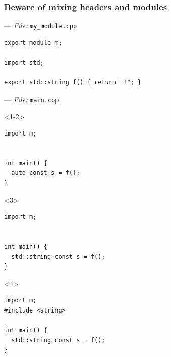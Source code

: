 \documentclass[aspectratio=169]{beamer}
\newif\iftransitions
\newcommand{\cpause}{\iftransitions \pause \fi}
\begin{document}
\begin{frame}[fragile]
  \frametitle{Beware of mixing headers and modules}
  --- \textit{File:} \texttt{my\_module.cpp}
  \begin{lstlisting}[style=cpp20]
export module m;

import std;

export std::string f() { return "!"; }
  \end{lstlisting}
  \cpause
  --- \textit{File:} \texttt{main.cpp}
  \begin{onlyenv}<1-2>
  \begin{lstlisting}[style=cpp20]
import m;


int main() {
  auto const s = f();
}
  \end{lstlisting}
  \end{onlyenv}
  \begin{onlyenv}<3>
  \begin{lstlisting}[style=cpp20]
import m;


int main() {
  std::string const s = f();
}
  \end{lstlisting}
  \end{onlyenv}
  \begin{onlyenv}<4>
  \begin{lstlisting}[style=cpp20]
import m;
#include <string>

int main() {
  std::string const s = f();
}
  \end{lstlisting}
  \end{onlyenv}

\end{frame}
\end{document}
